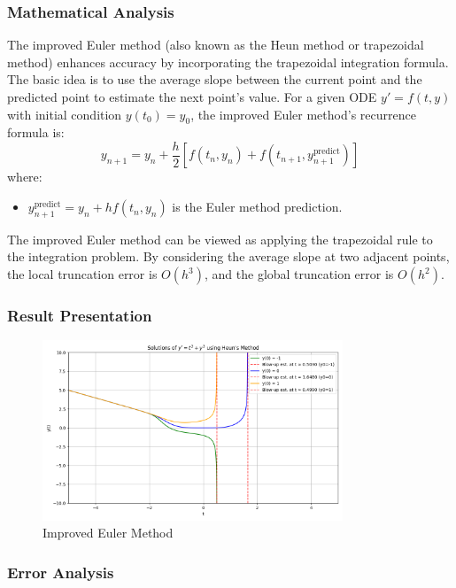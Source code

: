 \documentclass{article}
\begin{document}
\subsubsection{Mathematical Analysis}
The improved Euler method (also known as the Heun method or trapezoidal method) enhances accuracy by incorporating the trapezoidal integration formula. The basic idea is to use the average slope between the current point and the predicted point to estimate the next point's value. For a given ODE \( y' = f(t, y) \) with initial condition \( y(t_0) = y_0 \), the improved Euler method's recurrence formula is:
\[
y_{n+1} = y_n + \frac{h}{2} \left[ f(t_n, y_n) + f(t_{n+1}, y_{n+1}^{\text{predict}}) \right]
\]
where:
\begin{itemize}
    \item \( y_{n+1}^{\text{predict}} = y_n + h f(t_n, y_n) \) is the Euler method prediction.
\end{itemize}

The improved Euler method can be viewed as applying the trapezoidal rule to the integration problem. By considering the average slope at two adjacent points, the local truncation error is \( O(h^3) \), and the global truncation error is \( O(h^2) \).

\subsubsection{Result Presentation}

\begin{figure}[htbp]
    \centering
    \includegraphics[width=0.8\textwidth]{pic/Figure_1.png}
    \caption{Improved Euler Method}
    \label{fig:Improved Euler Method}
\end{figure}

\subsubsection{Error Analysis}
\end{document}
